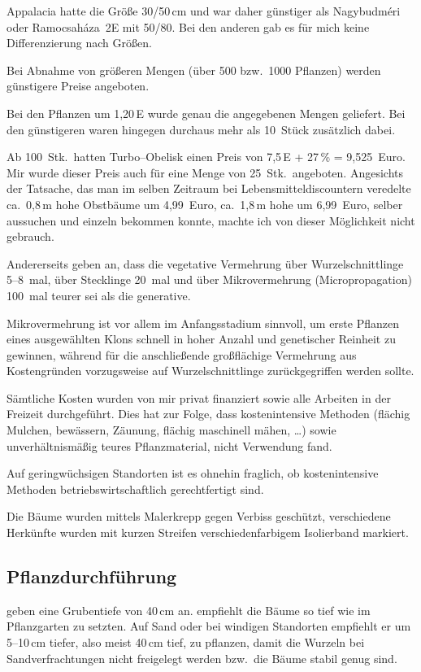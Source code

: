 \documentclass[twocolumn]{scrartcl}
\begin{document}
Appalacia hatte die Größe 30/50\,cm und war daher günstiger als
Nagybudméri oder Ramocsaháza~2E mit 50/80. Bei den anderen gab es für
mich keine Differenzierung nach Größen.

Bei Abnahme von größeren Mengen (über 500 bzw.\ 1000 Pflanzen) werden
günstigere Preise angeboten.

Bei den Pflanzen um 1,20\,E wurde genau die angegebenen Mengen
geliefert.  Bei den günstigeren waren hingegen durchaus mehr als
10~Stück zusätzlich dabei.

Ab 100~Stk.\ hatten Turbo--Obelisk einen Preis von 7,5\,E + 27\,\% =
9,525~Euro. Mir wurde dieser Preis auch für eine Menge von
25~Stk.\ angeboten. Angesichts der Tatsache, das man im selben
Zeitraum bei Lebensmitteldiscountern veredelte ca.\ 0,8\,m hohe
Obstbäume um 4,99~Euro, ca.\ 1,8\,m hohe um 6,99~Euro, selber
aussuchen und einzeln bekommen konnte, machte ich von dieser
Möglichkeit nicht gebrauch.

Andererseits geben
\citet{keresztesi1988robinieLw,redei2005robinieVermehrung} an, dass
die vegetative Vermehrung über Wurzelschnittlinge 5--8~mal, über
Stecklinge 20~mal und über Mikrovermehrung (Micropropagation) 100~mal
teurer sei als die generative.

Mikrovermehrung ist vor allem im Anfangsstadium sinnvoll, um erste
Pflanzen eines ausgewählten Klons schnell in hoher Anzahl und
genetischer Reinheit zu gewinnen, während für die anschließende
großflächige Vermehrung aus Kostengründen vorzugsweise auf
Wurzelschnittlinge zurückgegriffen werden sollte.

Sämtliche Kosten wurden von mir privat finanziert sowie alle Arbeiten
in der Freizeit durchgeführt. Dies hat zur Folge, dass kostenintensive
Methoden (flächig Mulchen, bewässern, Zäunung, flächig maschinell
mähen, \dots) sowie unverhältnismäßig teures Pflanzmaterial, nicht
Verwendung fand.

Auf geringwüchsigen Standorten ist es ohnehin fraglich, ob
kostenintensive Methoden betriebswirtschaftlich gerechtfertigt sind.

Die Bäume wurden mittels Malerkrepp gegen Verbiss geschützt,
verschiedene Herkünfte wurden mit kurzen Streifen verschiedenfarbigem
Isolierband markiert.

\subsection{Pflanzdurchführung}

\citet{ciuvat2022robinieRumaenien} geben eine Grubentiefe von 40\,cm
an. \citet[S.~164--165, 173]{vadas1911robinie} empfiehlt die Bäume so
tief wie im Pflanzgarten zu setzten. Auf Sand oder bei windigen
Standorten empfiehlt er um 5--10\,cm tiefer, also meist 40\,cm tief,
zu pflanzen, damit die Wurzeln bei Sandverfrachtungen nicht freigelegt
werden bzw.\ die Bäume stabil genug sind.
\end{document}
